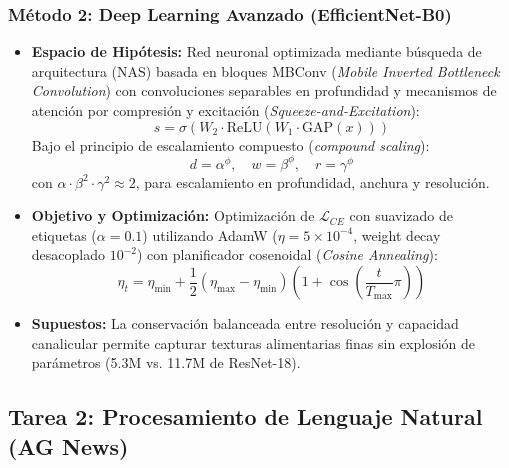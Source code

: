 \documentclass[conference]{IEEEtran}
\begin{document}
\subsubsection{Método 2: Deep Learning Avanzado (EfficientNet-B0)}
\begin{itemize}
    \item \textbf{Espacio de Hipótesis:} Red neuronal optimizada mediante búsqueda de arquitectura (NAS) basada en bloques MBConv (\textit{Mobile Inverted Bottleneck Convolution}) con convoluciones separables en profundidad y mecanismos de atención por compresión y excitación (\textit{Squeeze-and-Excitation}):
    \begin{equation}
    s = \sigma\left( W_2 \cdot \text{ReLU}(W_1 \cdot \text{GAP}(x)) \right)
    \end{equation}
    Bajo el principio de escalamiento compuesto (\textit{compound scaling}):
    \begin{equation}
    d = \alpha^\phi, \quad w = \beta^\phi, \quad r = \gamma^\phi
    \end{equation}
    con $\alpha \cdot \beta^2 \cdot \gamma^2 \approx 2$, para escalamiento en profundidad, anchura y resolución.
    \item \textbf{Objetivo y Optimización:} Optimización de $\mathcal{L}_{CE}$ con suavizado de etiquetas ($\alpha = 0.1$) utilizando AdamW ($\eta = 5 \times 10^{-4}$, weight decay desacoplado $10^{-2}$) con planificador cosenoidal (\textit{Cosine Annealing}):
    \begin{equation}
    \eta_t = \eta_{\min} + \frac{1}{2}(\eta_{\max} - \eta_{\min})\left(1 + \cos\left(\frac{t}{T_{\max}}\pi\right)\right)
    \end{equation}
    \item \textbf{Supuestos:} La conservación balanceada entre resolución y capacidad canalicular permite capturar texturas alimentarias finas sin explosión de parámetros (5.3M vs. 11.7M de ResNet-18).
\end{itemize}

\subsection{Tarea 2: Procesamiento de Lenguaje Natural (AG News)}
\end{document}
